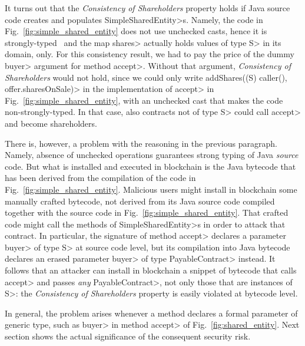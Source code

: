 It turns out that the \emph{Consistency of Shareholders} property holds if Java source code
creates and populates \<SimpleSharedEntity>s.
Namely, the code in Fig.~\ref{fig:simple_shared_entity}
does not use unchecked casts, hence it is strongly-typed~\cite{NaftalinW06} and
the map \<shares> actually holds values of type \<S> in its domain, only.
For this consistency result, we had to pay the price
of the dummy \<buyer> argument for method \<accept>. Without that argument,
\emph{Consistency of Shareholders} would not hold, since we could only write
\<addShares((S) caller(), offer.sharesOnSale)> in the implementation of \<accept> in
Fig.~\ref{fig:simple_shared_entity}, with an unchecked cast that makes the code
non-strongly-typed. In that case, also contracts not of type \<S> could call \<accept>
and become shareholders.

There is, however, a problem with the reasoning
in the previous paragraph. Namely, absence of unchecked
operations guarantees strong typing of Java \emph{source} code. But what is installed
and executed in blockchain is the Java bytecode that has been derived from
the compilation of the code in Fig.~\ref{fig:simple_shared_entity}.
Malicious users might install in blockchain some manually crafted bytecode,
not derived from its Java source code compiled together with the source code
in Fig.~\ref{fig:simple_shared_entity}.
That crafted code might
call the methods of \<SimpleSharedEntity>s in order to attack
that contract. In particular,
the signature of method \<accept> declares a parameter \<buyer> of type \<S> at source code level, but
its compilation into Java bytecode declares an erased
parameter \<buyer> of type \<PayableContract> instead.
It follows that an attacker can install in blockchain a snippet of bytecode that calls
\<accept> and passes \emph{any} \<PayableContract>, not only those that are instances of \<S>:
the \emph{Consistency of Shareholders} property is easily violated at bytecode level.

In general, the problem arises whenever a method declares a formal parameter of generic type,
such as \<buyer> in method \<accept> of Fig.~\ref{fig:shared_entity}. Next section shows
the actual significance of the consequent security risk.
